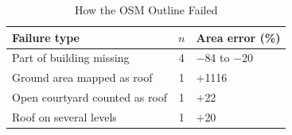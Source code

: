 \begin{table}[t]
\centering
\caption{How the OSM Outline Failed}
\label{tab:failures}
\footnotesize
\setlength{\tabcolsep}{3pt}
\begin{tabular}{lcl}
\toprule
Failure type & $n$ & Area error (\%) \\
\midrule
Part of building missing & 4 & $-$84 to $-$20 \\
Ground area mapped as roof & 1 & $+$1116 \\
Open courtyard counted as roof & 1 & $+$22 \\
Roof on several levels & 1 & $+$20 \\
\bottomrule
\end{tabular}
\end{table}